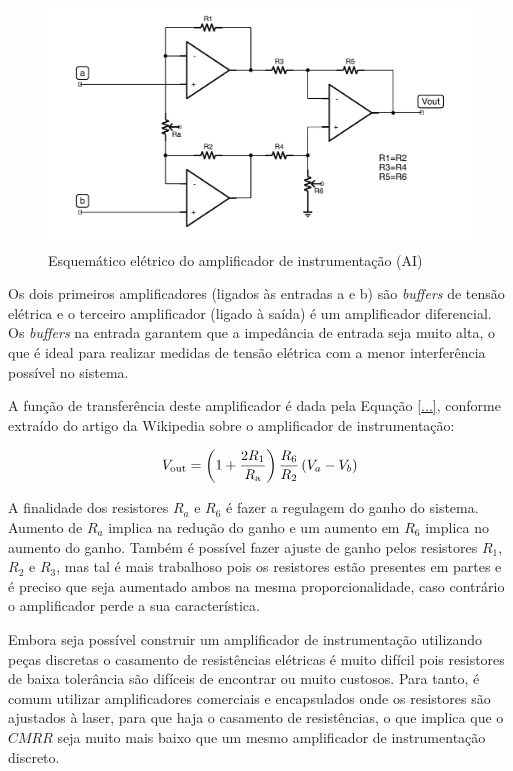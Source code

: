 \documentclass[a4paper]{instrumentacao}
\begin{document}
\begin{figure}[H]
\center
\includegraphics[width=\textwidth]{Amplificador-Instrumentacao.pdf}
\caption{Esquemático elétrico do amplificador de instrumentação (AI)}
\label{fig:amplificador-instrumentacao}
\end{figure}

Os dois primeiros amplificadores (ligados às entradas a e b) são \textit{buffers} de tensão elétrica e o terceiro amplificador (ligado à saída) é um amplificador diferencial. Os \textit{buffers} na entrada garantem que a impedância de entrada seja muito alta, o que é ideal para realizar medidas de tensão elétrica com a menor interferência possível no sistema.

A função de transferência deste amplificador é dada pela Equação \ref{...}, conforme extraído do artigo da Wikipedia\cite{wikipedia-ia} sobre o amplificador de instrumentação:

\begin{equation}
	V_\mathrm{out} = \left (1 + {2 R_1 \over R_\mathrm{a}} \right ) {R_6 \over R_2} \left(V_a - V_b\right)
\end{equation}

A finalidade dos resistores $R_a$ e $R_6$ é fazer a regulagem do ganho do sistema. Aumento de $R_a$ implica na redução do ganho e um aumento em $R_6$ implica no aumento do ganho. Também é possível fazer ajuste de ganho pelos resistores $R_1$, $R_2$ e $R_3$, mas tal é mais trabalhoso pois os resistores estão presentes em partes e é preciso que seja aumentado ambos na mesma proporcionalidade, caso contrário o amplificador perde a sua característica.

Embora seja possível construir um amplificador de instrumentação utilizando peças discretas o casamento de resistências elétricas é muito difícil pois resistores de baixa tolerância são difíceis de encontrar ou muito custosos. Para tanto, é comum utilizar amplificadores comerciais e encapsulados onde os resistores são ajustados à laser\cite{wikipedia-ia}, para que haja o casamento de resistências, o que implica que o $CMRR$ seja muito mais baixo que um mesmo amplificador de instrumentação discreto.
\end{document}
